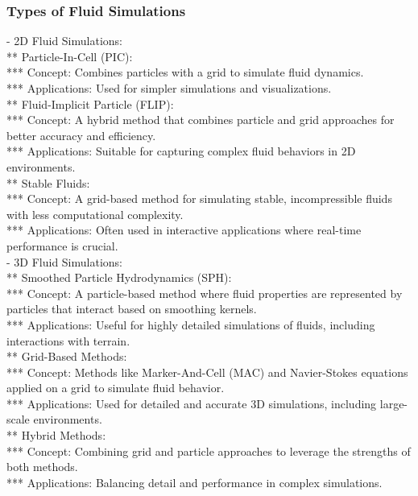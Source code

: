 \subsubsection{Types of Fluid Simulations}
- 2D Fluid Simulations: \\
** Particle-In-Cell (PIC): \\
*** Concept: Combines particles with a grid to simulate fluid dynamics. \\
*** Applications: Used for simpler simulations and visualizations. \\
** Fluid-Implicit Particle (FLIP): \\
*** Concept: A hybrid method that combines particle and grid approaches for better accuracy and efficiency. \\
*** Applications: Suitable for capturing complex fluid behaviors in 2D environments. \\
** Stable Fluids: \\
*** Concept: A grid-based method for simulating stable, incompressible fluids with less computational complexity. \\
*** Applications: Often used in interactive applications where real-time performance is crucial.\\
- 3D Fluid Simulations: \\
** Smoothed Particle Hydrodynamics (SPH): \\
*** Concept: A particle-based method where fluid properties are represented by particles that interact based on smoothing kernels. \\
*** Applications: Useful for highly detailed simulations of fluids, including interactions with terrain. \\
** Grid-Based Methods: \\
*** Concept: Methods like Marker-And-Cell (MAC) and Navier-Stokes equations applied on a grid to simulate fluid behavior. \\
*** Applications: Used for detailed and accurate 3D simulations, including large-scale environments. \\
** Hybrid Methods: \\
*** Concept: Combining grid and particle approaches to leverage the strengths of both methods.\\
*** Applications: Balancing detail and performance in complex simulations. 

